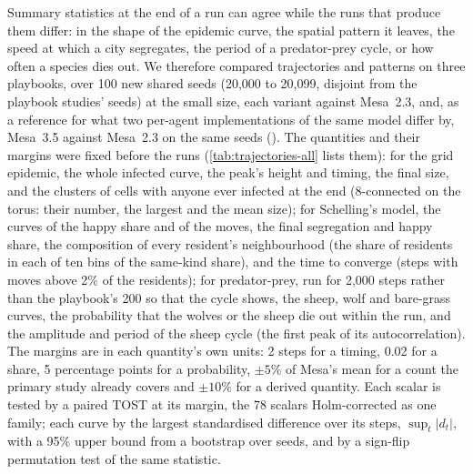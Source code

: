 Summary statistics at the end of a run can agree while the runs that produce them differ:
in the shape of the epidemic curve, the spatial pattern it leaves, the speed at which a city
segregates, the period of a predator-prey cycle, or how often a species dies out. We
therefore compared trajectories and patterns on three playbooks, over 100 new shared seeds
(20,000 to 20,099, disjoint from the playbook studies' seeds) at the small size, each \modelly{}
variant against Mesa~2.3, and, as a reference for what two per-agent implementations of
the same model differ by, Mesa~3.5 against Mesa~2.3 on the same seeds
(). The quantities and their margins were fixed before
the runs (\cref{tab:trajectories-all} lists them): for the grid epidemic, the whole
infected curve, the peak's height and timing, the final size, and the clusters of cells with
anyone ever infected at the end (8-connected on the torus: their number, the largest and
the mean size); for Schelling's model, the curves of the happy share and of the moves, the
final segregation and happy share, the composition of every resident's neighbourhood (the
share of residents in each of ten bins of the same-kind share), and the time to converge
(steps with moves above 2\% of the residents); for predator-prey, run for 2,000 steps
rather than the playbook's 200 so that the cycle shows, the sheep, wolf and bare-grass
curves, the probability that the wolves or the sheep die out within the run, and the
amplitude and period of the sheep cycle (the first peak of its autocorrelation). The
margins are in each quantity's own units: 2 steps for a timing, 0.02 for a share, 5
percentage points for a probability, $\pm 5\%$ of Mesa's mean for a count the primary study
already covers and $\pm 10\%$ for a derived quantity. Each scalar is tested by a paired TOST at
its margin, the 78 scalars Holm-corrected as one family; each curve by the largest
standardised difference over its steps, $\sup_t |d_t|$, with a 95\% upper bound from a
bootstrap over seeds, and by a sign-flip permutation test of the same statistic.

\begin{table}[htbp]
  \centering
  \small
  \caption{Trajectories and patterns over 100 shared seeds at the small size: per workload
  and implementation, the number of curves compared, the largest standardised difference
  over all steps of any curve and its 95\% bootstrap upper bound, the number of scalar
  quantities, their largest $|d|$, and how many are shown equivalent at their prespecified
  margin (paired TOST at 5\%; in brackets, after the Holm correction over all 78 scalars).
  Mesa~3.5 against Mesa~2.3 is the reference: two per-agent implementations of the same
  model. Generated by ; \cref{tab:trajectories-curves,tab:trajectories-all} in the
  appendix give every curve and every scalar.}
  \label{tab:trajectories}
  
\end{table}

